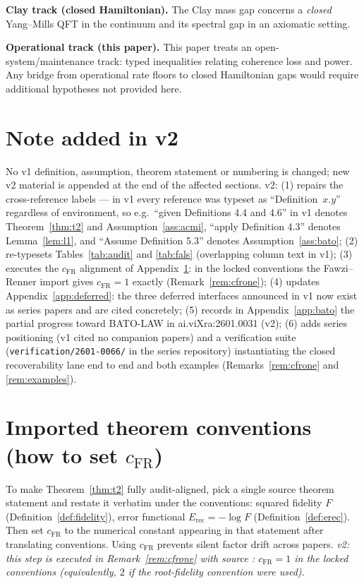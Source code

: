 \documentclass[11pt]{article}
\theoremstyle{definition}
\theoremstyle{remark}
\newcommand{\Erec}{E_{\mathrm{rec}}}
\begin{document}
\textbf{Clay track (closed Hamiltonian).} The Clay mass gap concerns a
\emph{closed} Yang--Mills QFT in the continuum and its spectral gap in
an axiomatic setting.

\textbf{Operational track (this paper).} This paper treats an
open-system/maintenance track: typed inequalities relating coherence
loss and power. Any bridge from operational rate floors to closed
Hamiltonian gaps would require additional hypotheses not provided here.

\section*{Note added in v2}
No v1 definition, assumption, theorem statement or numbering is changed;
new v2 material is appended at the end of the affected sections. v2:
(1) repairs the cross-reference labels --- in v1 every reference was
typeset as ``Definition~$x.y$'' regardless of environment, so e.g.\
``given Definitions 4.4 and 4.6'' in v1 denotes Theorem~\ref{thm:t2} and
Assumption~\ref{ass:acmi}, ``apply Definition 4.3'' denotes
Lemma~\ref{lem:l1}, and ``Assume Definition 5.3'' denotes
Assumption~\ref{ass:bato}; (2) re-typesets Tables~\ref{tab:audit} and
\ref{tab:fals} (overlapping column text in v1); (3) executes the
$c_{\mathrm{FR}}$ alignment of Appendix~\ref{app:cfr}: in the locked
conventions the Fawzi--Renner import gives $c_{\mathrm{FR}} = 1$ exactly
(Remark~\ref{rem:cfrone}); (4) updates Appendix~\ref{app:deferred}: the
three deferred interfaces announced in v1 now exist as series papers and
are cited concretely; (5) records in Appendix~\ref{app:bato} the partial
progress toward BATO-LAW in ai.viXra:2601.0031 (v2); (6) adds series
positioning (v1 cited no companion papers) and a verification suite
(\texttt{verification/2601-0066/} in the series repository)
instantiating the closed recoverability lane end to end and both examples
(Remarks~\ref{rem:cfrone} and \ref{rem:examples}).

\appendix

\section{Imported theorem conventions (how to set $c_{\mathrm{FR}}$)}
\label{app:cfr}

To make Theorem~\ref{thm:t2} fully audit-aligned, pick a single source
theorem statement and restate it verbatim under the conventions: squared
fidelity $F$ (Definition~\ref{def:fidelity}), error functional $\Erec =
-\log F$ (Definition~\ref{def:erec}). Then set $c_{\mathrm{FR}}$ to the
numerical constant appearing in that statement after translating
conventions. Using $c_{\mathrm{FR}}$ prevents silent factor drift across
papers. \emph{v2: this step is executed in Remark~\ref{rem:cfrone} with
source \cite{FR}: $c_{\mathrm{FR}} = 1$ in the locked conventions
(equivalently, $2$ if the root-fidelity convention were used).}
\end{document}
